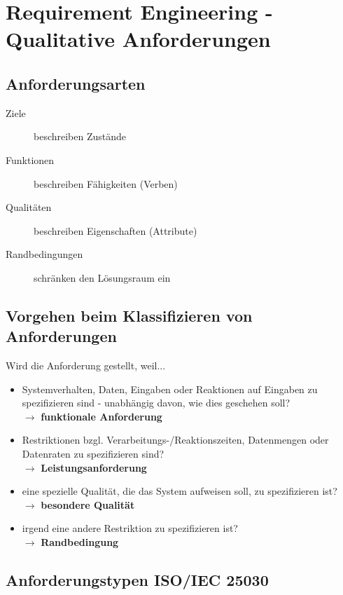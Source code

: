 \documentclass[a4paper]{article}
\begin{document}
\newpage

	\section{Requirement Engineering - Qualitative Anforderungen}
	
		\subsection{Anforderungsarten}
		
		\begin{description}
			\item[Ziele] beschreiben Zustände
			\item[Funktionen] beschreiben Fähigkeiten (Verben)
			\item[Qualitäten] beschreiben Eigenschaften (Attribute)
			\item[Randbedingungen] schränken den Lösungsraum ein
		\end{description}
	
		\subsection{Vorgehen beim Klassifizieren von Anforderungen}
		
		Wird die Anforderung gestellt, weil...
		\begin{itemize}
			\item Systemverhalten, Daten, Eingaben oder Reaktionen auf Eingaben zu spezifizieren sind - unabhängig davon, wie dies geschehen soll?\\
				$\rightarrow$ \textbf{funktionale Anforderung}
			\item Restriktionen bzgl. Verarbeitungs-/Reaktionszeiten, Datenmengen oder Datenraten zu spezifizieren sind?\\
				$\rightarrow$ \textbf{Leistungsanforderung}
			\item eine spezielle Qualität, die das System aufweisen soll, zu spezifizieren ist?\\
				$\rightarrow$ \textbf{besondere Qualität}
			\item irgend eine andere Restriktion zu spezifizieren ist?\\
				$\rightarrow$ \textbf{Randbedingung}
		\end{itemize}
	
		\subsection{Anforderungstypen ISO/IEC 25030}
		
\end{document}
